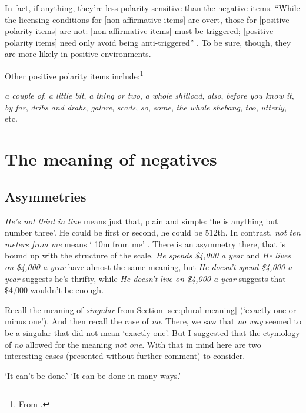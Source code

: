 In fact, if anything, they're less polarity sensitive than the negative items. ``While the licensing conditions for [non-affirmative items] are overt, those for [positive polarity items] are not: [non-affirmative items] must be triggered; [positive polarity items] need only avoid being anti-triggered'' \citep[28]{Israel2011}. To be sure, though, they are more likely in positive environments.

Other positive polarity items include:\footnote{From \citet[258--265]{Israel2011}.}

\ea \textit{a couple of}, \textit{a little bit}, \textit{a thing or two}, \textit{a whole shitload}, \textit{also}, \textit{before you know it}, \textit{by far}, \textit{dribs and drabs}, \textit{galore}, \textit{scads}, \textit{so}, \textit{some}, \textit{the whole shebang}, \textit{too}, \textit{utterly}, etc.
\z

\section{The meaning of negatives} \label{sec:meaning-of-negatives}

\subsection{Asymmetries}
\textit{He's not third in line} means just that, plain and simple: `he is anything but number three'. He could be first or second, he could be 512th. In contrast, \textit{not ten meters from me} means ` 10m from me' \citep[81]{Jespersen1917}. There is an asymmetry there, that is bound up with the structure of the scale. \textit{He spends \$4,000 a year} and \textit{He lives on \$4,000 a year} have almost the same meaning, but \textit{He doesn't spend \$4,000 a year} suggests he's thrifty, while \textit{He doesn't live on \$4,000 a year} suggests that \$4,000 wouldn't be enough.

\begin{tcolorbox}[title=The meaning of \textit{no}, colback=white]
    Recall the meaning of \textit{singular} from Section \ref{sec:plural-meaning} (`exactly one or minus one'). And then recall the case of \textit{no}. There, we saw that \textit{no way} seemed to be a singular that did not mean `exactly one'. But I suggested that the etymology of \textit{no} allowed for the meaning \textit{not one}. With that in mind here are two interesting cases (presented without further comment) to consider.
    
    \ea
        \phantom{[]}`It can't be done.'
        \phantom{[]}`It can be done in many ways.'
        \z
    \z
    \ea
        \z
    \z
\end{tcolorbox}

